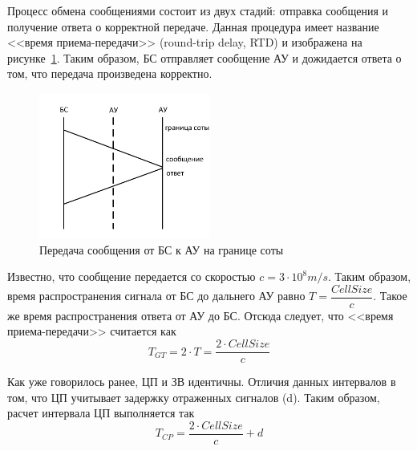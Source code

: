 Процесс обмена сообщениями состоит из двух стадий: отправка сообщения и получение ответа
о корректной передаче.
Данная процедура имеет название <<время приема-передачи>> (round-trip delay, RTD) и изображена на
рисунке~\ref{fig:vol_calc_CP}. Таким образом, БС отправляет сообщение АУ и дожидается ответа о том,
что передача произведена корректно.
\begin{figure}[H]
    \centering
    \includegraphics[width=0.5\textwidth]{img/vol_calc_CP}
    \caption{Передача сообщения от БС к АУ на границе соты}
    \label{fig:vol_calc_CP}
\end{figure}

Известно, что сообщение передается со скоростью \(c = 3 \cdot 10^{8} m/s\). Таким образом, время распространения сигнала от БС до дальнего АУ равно \(T = \dfrac{Cell Size}{c}\). Такое же время
распространения ответа от АУ до БС. Отсюда следует, что <<время приема-передачи>> считается как
\[T_{GT} = 2 \cdot T = \dfrac{2 \cdot Cell Size}{c}\]

Как уже говорилось ранее, ЦП и ЗВ идентичны. Отличия данных интервалов в том, что ЦП учитывает
задержку отраженных сигналов (d). Таким образом, расчет интервала ЦП выполняется так
\[T_{CP} = \dfrac{2 \cdot Cell Size}{c} + d\]